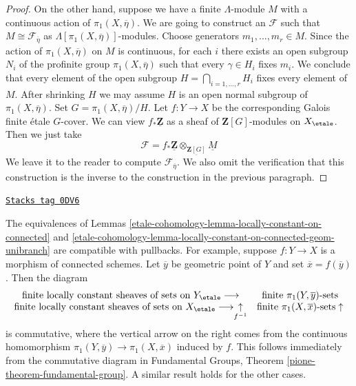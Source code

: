 \begin{proof}
\medskip\noindent
On the other hand, suppose we have a finite $\Lambda$-module $M$
with a continuous action of $\pi_1(X, \overline{\eta})$.
We are going to construct an $\mathcal{F}$ such that
$M \cong \mathcal{F}_{\overline{\eta}}$ as
$\Lambda[\pi_1(X, \overline{\eta})]$-modules.
Choose generators $m_1, \ldots, m_r \in M$.
Since the action of $\pi_1(X, \overline{\eta})$ on $M$ is
continuous, for each $i$ there exists an open subgroup
$N_i$ of the profinite group $\pi_1(X, \overline{\eta})$
such that every $\gamma \in H_i$ fixes $m_i$. We conclude that
every element of the open subgroup $H = \bigcap_{i = 1, \ldots, r} H_i$
fixes every element of $M$. After shrinking $H$ we may assume $H$
is an open normal subgroup of $\pi_1(X, \overline{\eta})$.
Set $G = \pi_1(X, \overline{\eta})/H$. Let $f : Y \to X$ be the
corresponding Galois finite \'etale $G$-cover.
We can view $f_*\underline{\mathbf{Z}}$ as a sheaf of
$\mathbf{Z}[G]$-modules on $X_\etale$. Then we just take
$$
\mathcal{F} =
f_*\underline{\mathbf{Z}} \otimes_{\underline{\mathbf{Z}[G]}} \underline{M}
$$
We leave it to the reader to compute
$\mathcal{F}_{\overline{\eta}}$.
We also omit the verification that this construction
is the inverse to the construction in the previous paragraph.
\end{proof}

\begin{remark}
\label{etale-cohomology-remark-functorial-locally-constant-on-connected}
\href{https://stacks.math.columbia.edu/tag/0DV6}{\texttt{Stacks tag 0DV6}}

The equivalences of Lemmas \ref{etale-cohomology-lemma-locally-constant-on-connected} and
\ref{etale-cohomology-lemma-locally-constant-on-connected-geom-unibranch}
are compatible with pullbacks. For example, suppose $f : Y \to X$
is a morphism of connected schemes. Let $\overline{y}$ be geometric
point of $Y$ and set $\overline{x} = f(\overline{y})$.
Then the diagram
$$
\begin{array}{cc}\text{finite locally constant sheaves of sets on }Y_\etale
\longrightarrow & \text{finite }\pi_1(Y, \overline{y})\text{-sets} \\ \text{finite locally constant sheaves of sets on }X_\etale
\longrightarrow\underset{f^{-1}}{\uparrow} & \text{finite }\pi_1(X, \overline{x})\text{-sets} \uparrow\end{array}
$$
is commutative, where the vertical arrow on the right comes
from the continuous homomorphism
$\pi_1(Y, \overline{y}) \to \pi_1(X, \overline{x})$
induced by $f$. This follows immediately from
the commutative diagram in
Fundamental Groups, Theorem \ref{pione-theorem-fundamental-group}.
A similar result holds for the other cases.
\end{remark}

